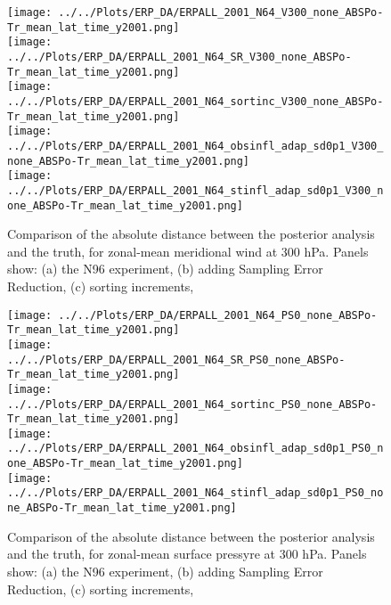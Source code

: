 \documentclass[11pt]{report}
\begin{document}
\begin{figure}
  \noindent
  \texttt{[image: ../../Plots/ERP\_DA/ERPALL\_2001\_N64\_V300\_none\_ABSPo-Tr\_mean\_lat\_time\_y2001.png]} \\
  \texttt{[image: ../../Plots/ERP\_DA/ERPALL\_2001\_N64\_SR\_V300\_none\_ABSPo-Tr\_mean\_lat\_time\_y2001.png]} \\
  \texttt{[image: ../../Plots/ERP\_DA/ERPALL\_2001\_N64\_sortinc\_V300\_none\_ABSPo-Tr\_mean\_lat\_time\_y2001.png]} \\
  \texttt{[image: ../../Plots/ERP\_DA/ERPALL\_2001\_N64\_obsinfl\_adap\_sd0p1\_V300\_none\_ABSPo-Tr\_mean\_lat\_time\_y2001.png]} \\
  \texttt{[image: ../../Plots/ERP\_DA/ERPALL\_2001\_N64\_stinfl\_adap\_sd0p1\_V300\_none\_ABSPo-Tr\_mean\_lat\_time\_y2001.png]} \\
   \caption{Comparison of the absolute distance between the posterior analysis and the truth, for zonal-mean meridional wind at 300 hPa.  Panels show: (a) the N96 experiment, (b) adding Sampling Error Reduction, (c) sorting increments, }
   \label{fig:V300}
 \end{figure}

\newpage

\begin{figure}
  \noindent
  \texttt{[image: ../../Plots/ERP\_DA/ERPALL\_2001\_N64\_PS0\_none\_ABSPo-Tr\_mean\_lat\_time\_y2001.png]} \\
  \texttt{[image: ../../Plots/ERP\_DA/ERPALL\_2001\_N64\_SR\_PS0\_none\_ABSPo-Tr\_mean\_lat\_time\_y2001.png]} \\
  \texttt{[image: ../../Plots/ERP\_DA/ERPALL\_2001\_N64\_sortinc\_PS0\_none\_ABSPo-Tr\_mean\_lat\_time\_y2001.png]} \\
  \texttt{[image: ../../Plots/ERP\_DA/ERPALL\_2001\_N64\_obsinfl\_adap\_sd0p1\_PS0\_none\_ABSPo-Tr\_mean\_lat\_time\_y2001.png]} \\
  \texttt{[image: ../../Plots/ERP\_DA/ERPALL\_2001\_N64\_stinfl\_adap\_sd0p1\_PS0\_none\_ABSPo-Tr\_mean\_lat\_time\_y2001.png]} \\
   \caption{Comparison of the absolute distance between the posterior analysis and the truth, for zonal-mean surface pressyre at 300 hPa.  Panels show: (a) the N96 experiment, (b)  adding Sampling Error Reduction, (c) sorting increments, }
   \label{fig:PS}
 \end{figure}



\end{document}
